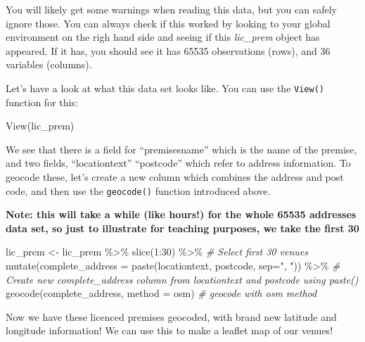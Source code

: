 \documentclass[
]{book}
\newenvironment{Shaded}{\begin{snugshade}}{\end{snugshade}}
\newcommand{\AttributeTok}[1]{\textcolor[rgb]{0.77,0.63,0.00}{#1}}
\newcommand{\CommentTok}[1]{\textcolor[rgb]{0.56,0.35,0.01}{\textit{#1}}}
\newcommand{\DecValTok}[1]{\textcolor[rgb]{0.00,0.00,0.81}{#1}}
\newcommand{\FunctionTok}[1]{\textcolor[rgb]{0.00,0.00,0.00}{#1}}
\newcommand{\NormalTok}[1]{#1}
\newcommand{\OtherTok}[1]{\textcolor[rgb]{0.56,0.35,0.01}{#1}}
\newcommand{\SpecialCharTok}[1]{\textcolor[rgb]{0.00,0.00,0.00}{#1}}
\newcommand{\StringTok}[1]{\textcolor[rgb]{0.31,0.60,0.02}{#1}}
\begin{document}
You will likely get some warnings when reading this data, but you can safely ignore those. You can always check if this worked by looking to your global environment on the righ hand side and seeing if this \emph{lic\_prem} object has appeared. If it has, you should see it has 65535 observations (rows), and 36 variables (columns).

Let's have a look at what this data set looks like. You can use the \texttt{View()} function for this:

\begin{Shaded}
\begin{Highlighting}[]
\FunctionTok{View}\NormalTok{(lic\_prem)}
\end{Highlighting}
\end{Shaded}

We see that there is a field for ``premisesname'' which is the name of the premise, and two fields, ``locationtext'' ``postcode'' which refer to address information. To geocode these, let's create a new column which combines the address and post code, and then use the \texttt{geocode()} function introduced above.

\textbf{Note: this will take a while (like hours!) for the whole 65535 addresses data set, so just to illustrate for teaching purposes, we take the first 30}

\begin{Shaded}
\begin{Highlighting}[]
\NormalTok{lic\_prem }\OtherTok{\textless{}{-}}\NormalTok{ lic\_prem }\SpecialCharTok{\%\textgreater{}\%} 
  \FunctionTok{slice}\NormalTok{(}\DecValTok{1}\SpecialCharTok{:}\DecValTok{30}\NormalTok{) }\SpecialCharTok{\%\textgreater{}\%}                                                            \CommentTok{\# Select first 30 venues}
  \FunctionTok{mutate}\NormalTok{(}\AttributeTok{complete\_address =} \FunctionTok{paste}\NormalTok{(locationtext, postcode, }\AttributeTok{sep=}\StringTok{", "}\NormalTok{)) }\SpecialCharTok{\%\textgreater{}\%}     \CommentTok{\# Create new complete\_address column from locationtext and postcode using paste()}
  \FunctionTok{geocode}\NormalTok{(complete\_address, }\AttributeTok{method =} \StringTok{\textquotesingle{}osm\textquotesingle{}}\NormalTok{)                                  }\CommentTok{\# geocode with osm method}
\end{Highlighting}
\end{Shaded}

Now we have these licenced premises geocoded, with brand new latitude and longitude information! We can use this to make a leaflet map of our venues!
\end{document}
